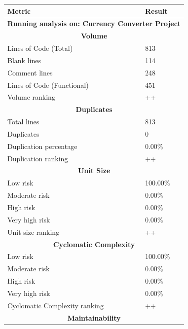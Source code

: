 \documentclass[11pt]{report}
\begin{document}
\begin{table}[H]
    \centering
    \begin{tabular}{|l|l|}
        \hline
        \textbf{Metric} & \textbf{Result} \\
        \hline
        \multicolumn{2}{|c|}{\textbf{Running analysis on: Currency Converter Project}} \\
        \hline
        \multicolumn{2}{|c|}{\textbf{Volume}} \\
        \hline
        Lines of Code (Total) & 813 \\
        \hline
        Blank lines & 114 \\
        \hline
        Comment lines & 248 \\
        \hline
        Lines of Code (Functional) & 451 \\
        \hline
        Volume ranking & ++ \\
        \hline
        \multicolumn{2}{|c|}{\textbf{Duplicates}} \\
        \hline
        Total lines & 813 \\
        \hline
        Duplicates & 0 \\
        \hline
        Duplication percentage & 0.00\% \\
        \hline
        Duplication ranking & ++ \\
        \hline
        \multicolumn{2}{|c|}{\textbf{Unit Size}} \\
        \hline
        Low risk & 100.00\% \\
        \hline
        Moderate risk & 0.00\% \\
        \hline
        High risk & 0.00\% \\
        \hline
        Very high risk & 0.00\% \\
        \hline
        Unit size ranking & ++ \\
        \hline
        \multicolumn{2}{|c|}{\textbf{Cyclomatic Complexity}} \\
        \hline
        Low risk & 100.00\% \\
        \hline
        Moderate risk & 0.00\% \\
        \hline
        High risk & 0.00\% \\
        \hline
        Very high risk & 0.00\% \\
        \hline
        Cyclomatic Complexity ranking & ++ \\
        \hline
        \multicolumn{2}{|c|}{\textbf{Maintainability}} \\

\end{tabular}
\end{table}
\end{document}
